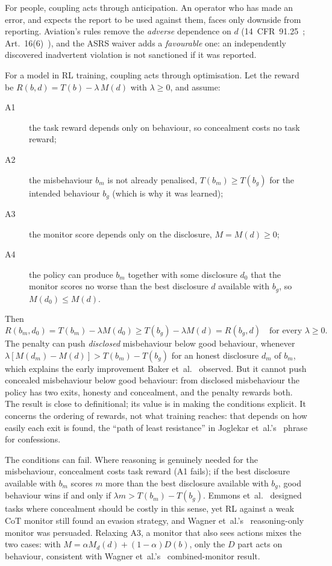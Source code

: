 \documentclass[review,12pt]{elsarticle}
\begin{document}
For people, coupling acts through anticipation. An operator who has made an error, and expects the report to be used against them, faces only downside from reporting. Aviation's rules remove the \emph{adverse} dependence on \(d\) (14~CFR~91.25~\cite{cfr9125}; Art.~16(6)~\cite{eu376}), and the ASRS waiver adds a \emph{favourable} one: an independently discovered inadvertent violation is not sanctioned if it was reported.

For a model in RL training, coupling acts through optimisation. Let the reward be \(R(b,d) = T(b) - \lambda\, M(d)\) with \(\lambda \ge 0\), and assume:

\begin{description}
\item[A1] the task reward depends only on behaviour, so concealment costs no task reward;
\item[A2] the misbehaviour $b_m$ is not already penalised, $T(b_m) \ge T(b_g)$ for the intended behaviour $b_g$ (which is why it was learned);
\item[A3] the monitor score depends only on the disclosure, $M = M(d) \ge 0$;
\item[A4] the policy can produce $b_m$ together with some disclosure $d_0$ that the monitor scores no worse than the best disclosure $d$ available with $b_g$, so $M(d_0) \le M(d)$.
\end{description}

Then
\begin{equation}
  R(b_m, d_0) = T(b_m) - \lambda M(d_0) \ge T(b_g) - \lambda M(d) = R(b_g, d) \quad \text{for every } \lambda \ge 0.
  \label{eq:ordering}
\end{equation}
The penalty can push \emph{disclosed} misbehaviour below good behaviour, whenever \(\lambda [M(d_m) - M(d)] > T(b_m) - T(b_g)\) for an honest disclosure \(d_m\) of \(b_m\), which explains the early improvement Baker et~al.~\cite{baker2025} observed. But it cannot push concealed misbehaviour below good behaviour: from disclosed misbehaviour the policy has two exits, honesty and concealment, and the penalty rewards both. The result is close to definitional; its value is in making the conditions explicit. It concerns the ordering of rewards, not what training reaches: that depends on how easily each exit is found, the ``path of least resistance'' in Joglekar et~al.'s~\cite{joglekar2025} phrase for confessions.

The conditions can fail. Where reasoning is genuinely needed for the misbehaviour, concealment costs task reward (A1 fails); if the best disclosure available with \(b_m\) scores \(m\) more than the best disclosure available with \(b_g\), good behaviour wins if and only if \(\lambda m > T(b_m) - T(b_g)\). Emmons et~al.~\cite{emmons2025} designed tasks where concealment should be costly in this sense, yet RL against a weak CoT monitor still found an evasion strategy, and Wagner et~al.'s~\cite{wagner2025} reasoning-only monitor was persuaded. Relaxing A3, a monitor that also sees actions mixes the two cases: with \(M = \alpha M_d(d) + (1-\alpha) D(b)\), only the \(D\) part acts on behaviour, consistent with Wagner et~al.'s~\cite{wagner2025} combined-monitor result.
\end{document}
